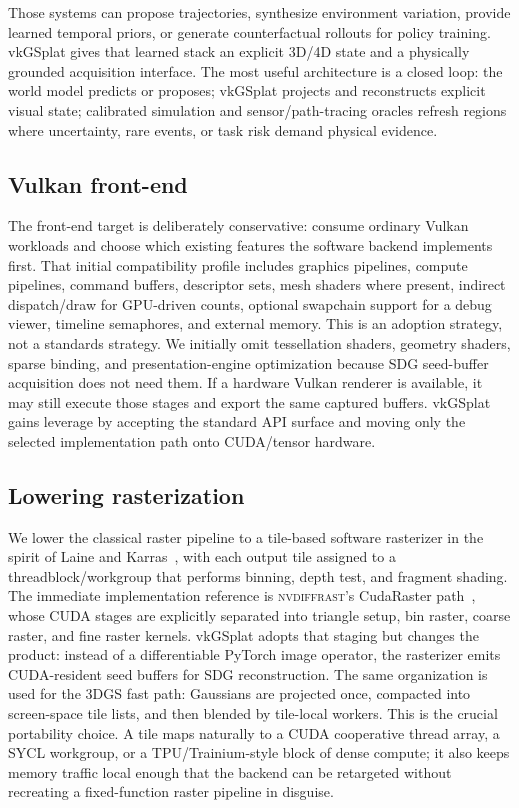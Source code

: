 \documentclass[10pt,journal,onecolumn]{IEEEtran}
\begin{document}
Those systems can propose trajectories, synthesize environment variation,
provide learned temporal priors, or generate counterfactual rollouts for policy
training. vkGSplat gives that learned stack an explicit 3D/4D state and a
physically grounded acquisition interface. The most useful architecture is a
closed loop: the world model predicts or proposes; vkGSplat projects and
reconstructs explicit visual state; calibrated simulation and sensor/path-tracing
oracles refresh regions where uncertainty, rare events, or task risk demand
physical evidence.

\subsection{Vulkan front-end}

The front-end target is deliberately conservative: consume ordinary Vulkan
workloads and choose which existing features the software backend implements
first. That initial compatibility profile includes graphics pipelines, compute
pipelines, command buffers, descriptor sets, mesh shaders where present,
indirect dispatch/draw for GPU-driven counts, optional swapchain support for a
debug viewer, timeline semaphores, and external memory. This is an adoption
strategy, not a standards strategy. We initially omit tessellation shaders,
geometry shaders, sparse binding, and presentation-engine optimization because
SDG seed-buffer acquisition does not need them. If a hardware Vulkan renderer is
available, it may still execute those stages and export the same captured
buffers. vkGSplat gains leverage by accepting the standard API surface and
moving only the selected implementation path onto CUDA/tensor hardware.

\subsection{Lowering rasterization}

We lower the classical raster pipeline to a tile-based software
rasterizer in the spirit of Laine and
Karras~\cite{laine2011software}, with each output tile assigned to a
threadblock\slash workgroup that performs binning, depth test, and
fragment shading.  The immediate implementation reference is
\textsc{nvdiffrast}'s CudaRaster path~\cite{laine2020nvdiffrast}, whose
CUDA stages are explicitly separated into triangle setup, bin raster,
coarse raster, and fine raster kernels.  vkGSplat adopts that staging
but changes the product: instead of a differentiable PyTorch image
operator, the rasterizer emits CUDA-resident seed buffers for SDG
reconstruction. The same organization is used for the 3DGS fast path:
Gaussians are projected once, compacted into screen-space tile lists,
and then blended by tile-local workers. This is the crucial portability
choice. A tile maps naturally to a CUDA cooperative thread array, a SYCL
workgroup, or a TPU/Trainium-style block of dense compute; it also keeps
memory traffic local enough that the backend can be retargeted without
recreating a fixed-function raster pipeline in disguise.
\end{document}

